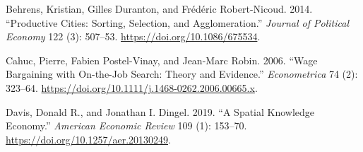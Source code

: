 \documentclass[
  letterpaper,
  DIV=11,
  numbers=noendperiod]{scrartcl}
\newlength{\cslhangindent}
\newlength{\cslentryspacingunit} %
\newenvironment{CSLReferences}[2] %
 {%
  \setlength{\parindent}{0pt}
  \ifodd #1
  \let\oldpar\par
  \def\par{\hangindent=\cslhangindent\oldpar}
  \fi
  \setlength{\parskip}{#2\cslentryspacingunit}
 }%
 {}
\begin{document}
\hypertarget{refs}{}
\begin{CSLReferences}{1}{0}
\leavevmode{}%
Behrens, Kristian, Gilles Duranton, and Frédéric Robert-Nicoud. 2014.
{``Productive {Cities}: {Sorting}, {Selection}, and {Agglomeration}.''}
\emph{Journal of Political Economy} 122 (3): 507--53.
\url{https://doi.org/10.1086/675534}.

\leavevmode{}%
Cahuc, Pierre, Fabien Postel-Vinay, and Jean-Marc Robin. 2006. {``Wage
{Bargaining} with {On-the-Job Search}: {Theory} and {Evidence}.''}
\emph{Econometrica} 74 (2): 323--64.
\url{https://doi.org/10.1111/j.1468-0262.2006.00665.x}.

\leavevmode{}%
Davis, Donald R., and Jonathan I. Dingel. 2019. {``A {Spatial Knowledge
Economy}.''} \emph{American Economic Review} 109 (1): 153--70.
\url{https://doi.org/10.1257/aer.20130249}.

\end{CSLReferences}
\end{document}
